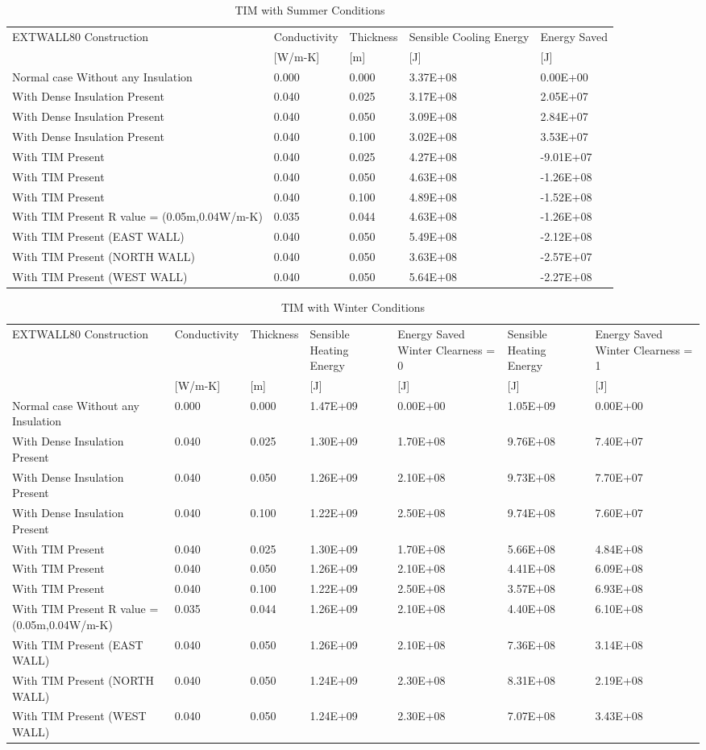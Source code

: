 {\scriptsize
\begin{longtable}[c]{p{2.5in}p{0.75in}p{0.75in}p{0.75in}p{0.75in}}
\caption{  TIM with Summer Conditions \label{table:tim-with-summer-conditions}}\\
\toprule 
EXTWALL80 Construction & Conductivity & Thickness & Sensible Cooling Energy & Energy Saved \tabularnewline
~ & [W/m-K] & [m] & [J] & [J] \tabularnewline
\midrule
\endhead
Normal case Without any Insulation & 0.000 & 0.000 & 3.37E+08 & 0.00E+00 \tabularnewline
With Dense Insulation Present & 0.040 & 0.025 & 3.17E+08 & 2.05E+07 \tabularnewline
With Dense Insulation Present & 0.040 & 0.050 & 3.09E+08 & 2.84E+07 \tabularnewline
With Dense Insulation Present & 0.040 & 0.100 & 3.02E+08 & 3.53E+07 \tabularnewline
With TIM Present & 0.040 & 0.025 & 4.27E+08 & -9.01E+07 \tabularnewline
With TIM Present & 0.040 & 0.050 & 4.63E+08 & -1.26E+08 \tabularnewline
With TIM Present & 0.040 & 0.100 & 4.89E+08 & -1.52E+08 \tabularnewline
With TIM Present R value = (0.05m,0.04W/m-K) & 0.035 & 0.044 & 4.63E+08 & -1.26E+08 \tabularnewline
With TIM Present (EAST WALL) & 0.040 & 0.050 & 5.49E+08 & -2.12E+08 \tabularnewline
With TIM Present (NORTH WALL) & 0.040 & 0.050 & 3.63E+08 & -2.57E+07 \tabularnewline
With TIM Present (WEST WALL) & 0.040 & 0.050 & 5.64E+08 & -2.27E+08 \tabularnewline
\bottomrule
\end{longtable}}

{\scriptsize
\begin{longtable}[c]{p{1.0in}p{0.75in}p{0.75in}p{0.75in}p{0.75in}p{0.75in}p{0.75in}}
\caption{TIM with Winter Conditions \label{table:tim-with-winter-conditions}}\\
\toprule 
EXTWALL80 Construction & Conductivity & Thickness & Sensible Heating Energy & Energy Saved Winter Clearness = 0 & Sensible Heating Energy & Energy Saved Winter Clearness = 1 \tabularnewline
~ & [W/m-K] & [m] & [J] & [J] & [J] & [J] \tabularnewline
\midrule
\endhead
Normal case Without any Insulation & 0.000 & 0.000 & 1.47E+09 & 0.00E+00 & 1.05E+09 & 0.00E+00 \tabularnewline
With Dense Insulation Present & 0.040 & 0.025 & 1.30E+09 & 1.70E+08 & 9.76E+08 & 7.40E+07 \tabularnewline
With Dense Insulation Present & 0.040 & 0.050 & 1.26E+09 & 2.10E+08 & 9.73E+08 & 7.70E+07 \tabularnewline
With Dense Insulation Present & 0.040 & 0.100 & 1.22E+09 & 2.50E+08 & 9.74E+08 & 7.60E+07 \tabularnewline
With TIM Present & 0.040 & 0.025 & 1.30E+09 & 1.70E+08 & 5.66E+08 & 4.84E+08 \tabularnewline
With TIM Present & 0.040 & 0.050 & 1.26E+09 & 2.10E+08 & 4.41E+08 & 6.09E+08 \tabularnewline
With TIM Present & 0.040 & 0.100 & 1.22E+09 & 2.50E+08 & 3.57E+08 & 6.93E+08 \tabularnewline
With TIM Present R value = (0.05m,0.04W/m-K) & 0.035 & 0.044 & 1.26E+09 & 2.10E+08 & 4.40E+08 & 6.10E+08 \tabularnewline
With TIM Present (EAST WALL) & 0.040 & 0.050 & 1.26E+09 & 2.10E+08 & 7.36E+08 & 3.14E+08 \tabularnewline
With TIM Present (NORTH WALL) & 0.040 & 0.050 & 1.24E+09 & 2.30E+08 & 8.31E+08 & 2.19E+08 \tabularnewline
With TIM Present (WEST WALL) & 0.040 & 0.050 & 1.24E+09 & 2.30E+08 & 7.07E+08 & 3.43E+08 \tabularnewline
\bottomrule
\end{longtable}}

